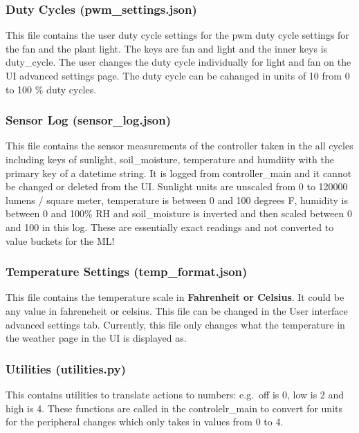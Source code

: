 \documentclass[
]{article}
\begin{document}
\hypertarget{duty-cycles-pwm_settings.json}{%
\subsubsection{Duty Cycles
(pwm\_settings.json)}\label{duty-cycles-pwm_settings.json}}

This file contains the user duty cycle settings for the pwm duty cycle
settings for the fan and the plant light. The keys are fan and light and
the inner keys is duty\_cycle. The user changes the duty cycle
individually for light and fan on the UI advanced settings page. The
duty cycle can be cahanged in units of 10 from 0 to 100 \% duty cycles.

\hypertarget{sensor-log-sensor_log.json}{%
\subsubsection{Sensor Log
(sensor\_log.json)}\label{sensor-log-sensor_log.json}}

This file contains the sensor measurements of the controller taken in
the all cycles including keys of sunlight, soil\_moisture, temperature
and humdiity with the primary key of a datetime string. It is logged
from controller\_main and it cannot be changed or deleted from the UI.
Sunlight units are unscaled from 0 to 120000 lumens / square meter,
temperature is between 0 and 100 degrees F, humidity is between 0 and
100\% RH and soil\_moisture is inverted and then scaled between 0 and
100 in this log. These are essentially exact readings and not converted
to value buckets for the ML!

\hypertarget{temperature-settings-temp_format.json}{%
\subsubsection{Temperature Settings
(temp\_format.json)}\label{temperature-settings-temp_format.json}}

This file contains the temperature scale in \textbf{Fahrenheit or
Celsius}. It could be any value in fahreneheit or celsius. This file can
be changed in the User interface advanced settings tab. Currently, this
file only changes what the temperature in the weather page in the UI is
displayed as.

\hypertarget{utilities-utilities.py}{%
\subsubsection{Utilities (utilities.py)}\label{utilities-utilities.py}}

This contains utilities to translate actions to numbers: e.g.~off is 0,
low is 2 and high is 4. These functions are called in the
controlelr\_main to convert for units for the peripheral changes which
only takes in values from 0 to 4.
\end{document}
